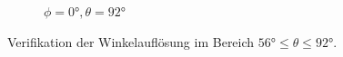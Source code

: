 \begin{figure}
\begin{subfigure}[b]{0.48\textwidth}
                \label{fig:Foto_DSP_Draufsicht}
                \caption{$\phi=0°, \theta = 92°$}
        \end{subfigure}
        \caption{Verifikation der Winkelauflösung im Bereich $56° \leq \theta \leq 92°$.}
        \label{fig:verifikation_winkelaufloesung_2}
\end{figure}


